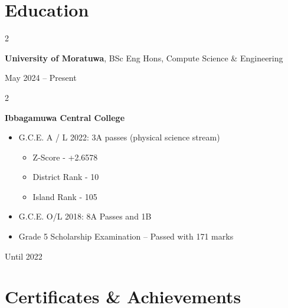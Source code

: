 \documentclass[10pt, letterpaper]{article}
\newenvironment{highlights}{
    \begin{itemize}[
        topsep=0.10 cm,
        parsep=0.10 cm,
        partopsep=0pt,
        itemsep=0pt,
        leftmargin=0.4 cm + 10pt
    ]
}{
    \end{itemize}
} %
\newenvironment{twocolentry}[2][]{
    \onecolentry
    \def\secondColumn{#2}
    \setcolumnwidth{\fill, 4.5 cm}
    \begin{paracol}{2}
}{
    \switchcolumn \raggedleft \secondColumn
    \end{paracol}
    \endonecolentry
} %
\begin{document}
          \section{Education}



        
        \begin{twocolentry}{
            May 2024 – Present
        }
            \textbf{University of Moratuwa}, BSc Eng Hons, Compute Science \& Engineering
            
         
        \end{twocolentry}



   \vspace{0.2 cm}
        \begin{twocolentry}{
            Until 2022
        }
            \textbf{Ibbagamuwa Central College }

    \begin{highlights}
                
    \item G.C.E. A / L 2022: 3A passes (physical science stream)  \begin{itemize}
        \item Z-Score - +2.6578
        \item District Rank - 10
        \item Island Rank - 105
    \end{itemize}
    
       \item G.C.E. O/L 2018: 8A Passes and 1B
     \item Grade 5 Scholarship Examination – Passed with 171 marks
    \end{highlights} 
    \end{twocolentry}
    
    \section{ Certificates \& Achievements }
   
\end{document}
